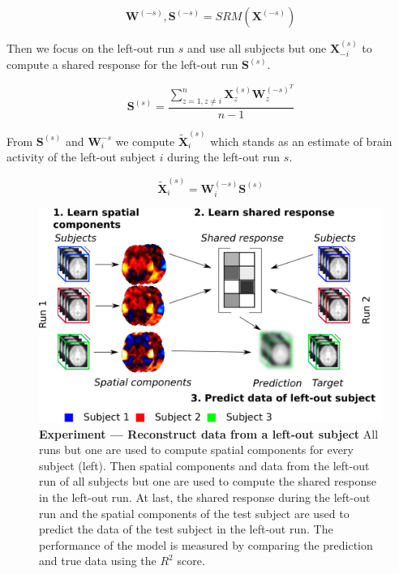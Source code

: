 \begin{equation*}
	\mathbf{W}^{(-s)}, \mathbf{S}^{(-s)} = SRM(\mathbf{X}^{(-s)})
\end{equation*}

Then we focus on the left-out run $s$ and use all subjects but one $\mathbf{X}^{(s)}_{-i}$ to compute a shared response for the left-out run $\mathbf{S}^{(s)}$.

\begin{equation*}
	\mathbf{S}^{(s)} = \frac{\sum_{z=1, z\neq i}^n \mathbf{X}^{(s)}_z\mathbf{W}^{(-s)^T}_z}{n - 1}
\end{equation*}

From $\mathbf{S}^{(s)}$ and $\mathbf{W}_i^{-s}$ we compute $\widetilde{\mathbf{X}}^{(s)}_i$ which stands as an estimate of brain activity of the left-out subject $i$ during the left-out run $s$.

\begin{equation*}
	\widetilde{\mathbf{X}}_i^{(s)} = \mathbf{W}^{(-s)}_i \mathbf{S}^{(s)}
\end{equation*}


\begin{figure}
\centering
\includegraphics[scale=0.24]{figures/srm/conceptual_figure41.png}
\caption{\textbf{Experiment — Reconstruct data from a left-out subject} All runs but one are used to compute spatial components for every subject (left).
  Then spatial components and data from the left-out run of all subjects but one are used to compute the shared response in the left-out run.
  At last, the shared response during the left-out run and  the spatial components of the test subject are used to predict the data of the test subject in the left-out run.
  The performance of the model is measured by comparing the prediction and true data using the $R^2$ score.}
\label{fig:experiment_reconstruction}
\end{figure}


